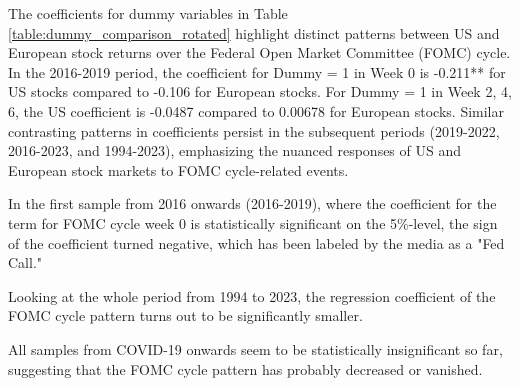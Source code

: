 The coefficients for dummy variables in Table \ref{table:dummy_comparison_rotated} highlight distinct patterns between US and European stock returns over the Federal Open Market Committee (FOMC) cycle. In the 2016-2019 period, the coefficient for Dummy = 1 in Week 0 is -0.211** for US stocks compared to -0.106 for European stocks. For Dummy = 1 in Week 2, 4, 6, the US coefficient is -0.0487 compared to 0.00678 for European stocks. Similar contrasting patterns in coefficients persist in the subsequent periods (2019-2022, 2016-2023, and 1994-2023), emphasizing the nuanced responses of US and European stock markets to FOMC cycle-related events.


In the first sample from 2016 onwards (2016-2019), where the coefficient for the term for FOMC cycle week 0 is statistically significant on the 5\%-level, the sign of the coefficient turned negative, which has been labeled by the media as a "Fed Call." \parencite{noauthor_fed_nodate}

Looking at the whole period from 1994 to 2023, the regression coefficient of the FOMC cycle pattern turns out to be significantly smaller.

All samples from COVID-19 onwards seem to be statistically insignificant so far, suggesting that the FOMC cycle pattern has probably decreased or vanished.




